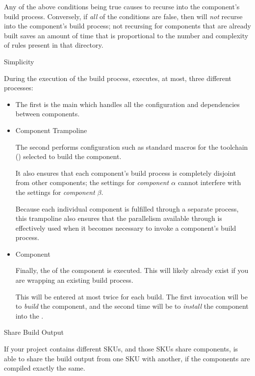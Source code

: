 \begin{description}
  Any of the above conditions being true causes \lmsbw to recurse into
  the component's build process.  Conversely, if \emph{all} of the
  conditions are false, then \lmsbw will \emph{not} recurse into the
  component's build process; not recursing for components that are
  already built saves an amount of time that is proportional to the
  number and complexity of \make rules present in that directory.

\item \makefile Simplicity

  During the execution of the build process, \lmsbw executes, at most,
  three different \makefile processes:

  \begin{itemize}
  \item \lmsbw \makefile

    The first is the main \lmsbw \makefile which handles all the
    configuration and dependencies between components.

  \item Component Trampoline \makefile

    The second \makefile performs configuration such as standard
    \makefile macros for the toolchain ()
    selected to build the component.

    It also ensures that each component's build process is completely
    disjoint from other components; the settings for \emph{component
      $\alpha$} cannot interfere with the settings for \emph{component
      $\beta$}.

    Because each individual component is fulfilled through a separate
    \make process, this trampoline also ensures that the parallelism
    available through \gnumake is effectively used when it becomes
    necessary to invoke a component's build process.

  \item Component \makefile

    Finally, the \makefile of the component is executed.  This will
    likely already exist if you are wrapping an existing build process.

    This \makefile will be entered at most twice for each build.  The
    first invocation will be to \emph{build} the component, and the
    second time will be to \emph{install} the component into the
    \destdir.
\end{itemize}

\item Share Build Output

  If your project contains different SKUs, and those SKUs share
  components, \lmsbw is able to share the build output from one SKU
  with another, if the components are compiled exactly the same.

\end{description}

